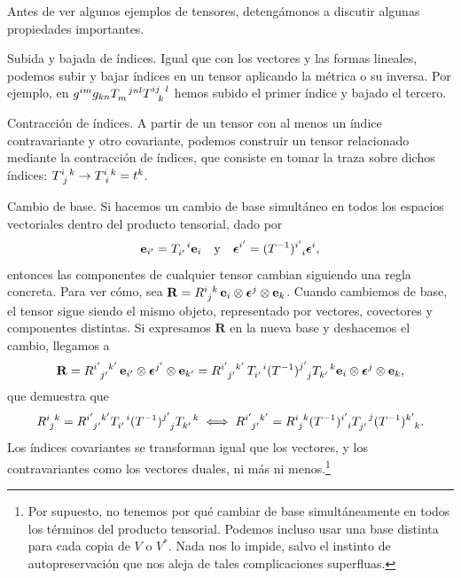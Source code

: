 Antes de ver algunos ejemplos de tensores, detengámonos a discutir algunas propiedades importantes.
\begin{myitemize}
    \item Subida y bajada de índices. Igual que con los vectores y las formas lineales, podemos subir y bajar índices en un tensor aplicando la métrica o su inversa. Por ejemplo, en \(g^{im}g_{kn}\tensor{T}{_m^j^n^l}\tensor{T}{^i^j_k^l}\) hemos subido el primer índice y bajado el tercero.
    \item Contracción de índices. A partir de un tensor con al menos un índice contravariante y otro covariante, podemos construir un tensor relacionado mediante la contracción de índices, que consiste en tomar la traza sobre dichos índices: \(\tensor{T}{^i_j^k}\rightarrow\tensor{T}{^i_i^k} = t^k\).
    \item Cambio de base. Si hacemos un cambio de base simultáneo en todos los espacios vectoriales dentro del producto tensorial, dado por 
    \begin{equation}
        \mathbf{e}_{i'} = \tensor{T}{_{i'}^i}\mathbf{e}_{i}\quad\text{y}\quad \boldsymbol{\epsilon}^{i'} = \tensor{(T^{-1})}{^{i'}_i}\boldsymbol{\epsilon}^{i},
    \end{equation}
    entonces las componentes de cualquier tensor cambian siguiendo una regla concreta. Para ver cómo, sea \(\mathbf{R} = \tensor{R}{^i_j^k}\,\mathbf{e}_i\otimes\boldsymbol{\epsilon}^j\otimes \mathbf{e}_k\). Cuando cambiemos de base, el tensor sigue siendo el mismo objeto, representado por vectores, covectores y componentes distintas. Si expresamos \(\mathbf{R}\) en la nueva base y deshacemos el cambio, llegamos a
    \begin{equation}
        \mathbf{R} = \tensor{R}{^{i'}_{j'}^{k'}}\,\mathbf{e}_{i'}\otimes\boldsymbol{\epsilon}^{j'}\otimes \mathbf{e}_{k'} = \tensor{R}{^{i'}_{j'}^{k'}}\,\tensor{T}{_{i'}^i}\tensor{(T^{-1})}{^{j'}_j}\tensor{T}{_{k'}^k}\mathbf{e}_{i}\otimes\boldsymbol{\epsilon}^{j}\otimes \mathbf{e}_{k},
    \end{equation}
    que demuestra que 
    \begin{equation}
        \tensor{R}{^i_j^k} = \tensor{R}{^{i'}_{j'}^{k'}}\tensor{T}{_{i'}^i}\tensor{(T^{-1})}{^{j'}_j}\tensor{T}{_{k'}^k} \iff 
        \tensor{R}{^{i'}_{j'}^{k'}} = \tensor{R}{^i_j^k} \tensor{(T^{-1})}{^{i'}_i}\tensor{T}{_{j'}^j}\tensor{(T^{-1})}{^{k'}_k}.
    \end{equation}
    Los índices covariantes se transforman igual que los vectores, y los contravariantes como los vectores duales, ni más ni menos.\footnote{Por supuesto, no tenemos por qué cambiar de base simultáneamente en todos los términos del producto tensorial. Podemos incluso usar una base distinta para cada copia de \(V\) o \(V^*\). Nada nos lo impide, salvo el instinto de autopreservación que nos aleja de tales complicaciones superfluas.}
\end{myitemize}

